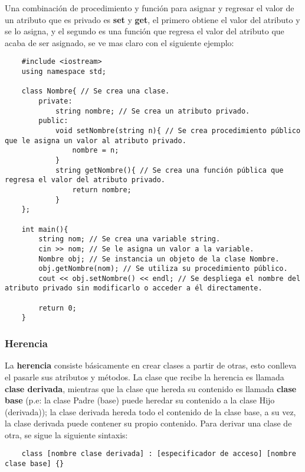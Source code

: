 Una combinación de procedimiento y función para asignar y regresar el valor de un atributo que es privado es \textbf{set} y \textbf{get}, el primero obtiene el valor del atributo y se lo asigna, y el segundo es una función que regresa el valor del atributo que acaba de ser asignado, se ve mas claro con el siguiente ejemplo:
\begin{lstlisting}
    #include <iostream>
    using namespace std;

    class Nombre{ // Se crea una clase.
        private:
            string nombre; // Se crea un atributo privado.
        public:
            void setNombre(string n){ // Se crea procedimiento público que le asigna un valor al atributo privado.
                nombre = n;
            }
            string getNombre(){ // Se crea una función pública que regresa el valor del atributo privado.
                return nombre;
            }
    };
    
    int main(){
        string nom; // Se crea una variable string.
        cin >> nom; // Se le asigna un valor a la variable.
        Nombre obj; // Se instancia un objeto de la clase Nombre.
        obj.getNombre(nom); // Se utiliza su procedimiento público.
        cout << obj.setNombre() << endl; // Se despliega el nombre del atributo privado sin modificarlo o acceder a él directamente.
        
        return 0;
    }
\end{lstlisting}


\subsubsection{Herencia}

La \textbf{herencia} consiste básicamente en crear clases a partir de otras, esto conlleva el pasarle sus atributos y métodos. La clase que recibe la herencia es llamada \textbf{clase derivada}, mientras que la clase que hereda su contenido es llamada \textbf{clase base} (p.e: la clase Padre (base) puede heredar su contenido a la clase Hijo (derivada)); la clase derivada hereda todo el contenido de la clase base, a su vez, la clase derivada puede contener su propio contenido. Para derivar una clase de otra, se sigue la siguiente sintaxis:
\begin{lstlisting}
    class [nombre clase derivada] : [especificador de acceso] [nombre clase base] {}
\end{lstlisting}

